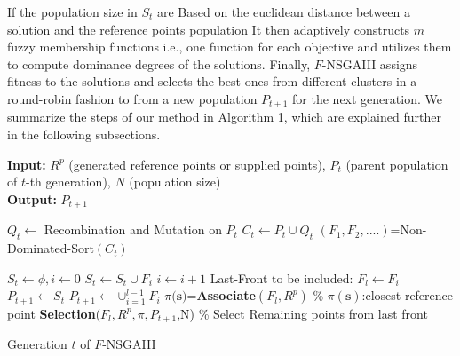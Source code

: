 \documentclass[letterpaper, 10 pt, conference]{ieeeconf}  %
\begin{document}
If the population size in $S_t$ are Based on the euclidean distance between a solution and the reference points population
It then adaptively constructs $m$ fuzzy membership functions i.e., one function for each objective 
and utilizes them to compute dominance degrees of the solutions. Finally, $F$-NSGAIII assigns fitness to the solutions and selects the best ones from different clusters in a round-robin fashion to from a new population $P_{t+1}$ for the next generation.  
We summarize the steps of our method in Algorithm 1, which are explained further in the following subsections.



 \begin{algorithm}[!h]
	
 	\textbf{Input:} $R^p$ (generated reference points or supplied points), $P_t$ (parent population of $t$-th generation), $N$ (population size)\\
 	\textbf{Output:} $P_{t+1}$
	
 	\begin{algorithmic}[1]
		\State $Q_t \gets $ Recombination and Mutation on $P_t$
 		\State $C_t \gets P_t \cup Q_t$				 	
 		\State $(F_1,F_2,....)$=Non-Dominated-Sort$(C_t)$
        
        \State $S_t \gets \phi , i\gets 0$
        \State $S_t \gets S_t \cup F_i$
        \State $i \gets i+1$
        \EndWhile
        \State Last-Front to be included: $F_l \gets F_i$
        \State $P_{t+1} \gets S_t$
        \Else
        \State $P_{t+1} \gets \cup _{i=1}^{l-1}F_i$
        \State $\pi({\textbf{s})}$=\textbf{Associate}$(F_l,R^p)$ \% $\pi({\textbf{s}})$:closest reference point 
        \State \textbf{Selection}($F_l,R^p,\pi,P_{t+1}$,N)  \% Select Remaining points from last front
        
        \EndIf
        
        
		
	\end{algorithmic} 
	
	\caption{Generation $t$ of $F$-NSGAIII}
	
 	\label{alg:completeAlgorithm}
 \end{algorithm}
\end{document}
